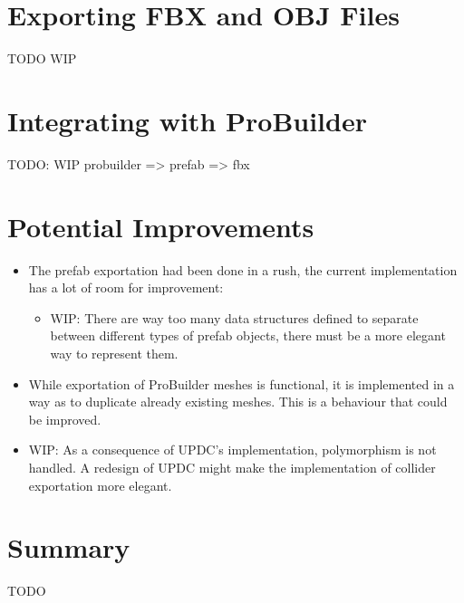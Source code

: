 \documentclass[12pt,a4paper]{article}
\begin{document}
\section{Exporting FBX and OBJ Files}
TODO WIP

\section{Integrating with ProBuilder}
TODO: WIP probuilder => prefab => fbx

\section{Potential Improvements}
\begin{itemize}
\item The prefab exportation had been done in a rush, the current implementation has a lot of room for improvement:
\begin{itemize}
\item WIP: There are way too many data structures defined to separate between different types of prefab objects, there must be a more elegant way to represent them.
\end{itemize}
\item While exportation of ProBuilder meshes is functional, it is implemented in a way as to duplicate already existing meshes. This is a behaviour that could be improved.
\item WIP: As a consequence of UPDC's implementation, polymorphism is not handled. A redesign of UPDC might make the implementation of collider exportation more elegant.
\end{itemize}

\section{Summary}
TODO
\end{document}
